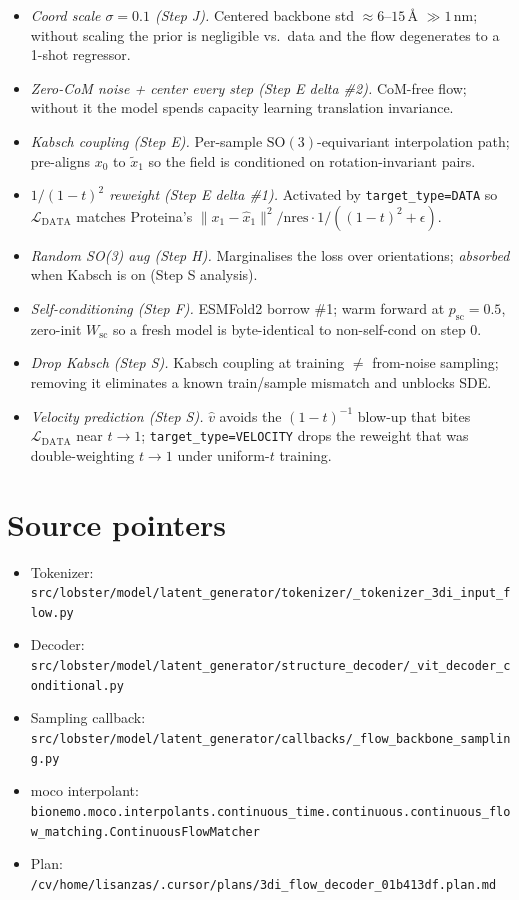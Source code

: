 \documentclass[11pt]{article}
\begin{document}
\begin{itemize}\itemsep -1pt
\item \emph{Coord scale $\sigma=0.1$ (Step J).} Centered backbone std $\approx 6$--$15$\,\AA{} $\gg 1$\,nm; without scaling the prior is negligible vs.\ data and the flow degenerates to a 1-shot regressor.
\item \emph{Zero-CoM noise + center every step (Step E delta \#2).} CoM-free flow; without it the model spends capacity learning translation invariance.
\item \emph{Kabsch coupling (Step E).} Per-sample $\mathrm{SO}(3)$-equivariant interpolation path; pre-aligns $x_0$ to $\tilde x_1$ so the field is conditioned on rotation-invariant pairs.
\item \emph{$1/(1-t)^2$ reweight (Step E delta \#1).} Activated by \texttt{target\_type=DATA} so $\mathcal{L}_\text{DATA}$ matches Proteina's $\|x_1 - \hat{x}_1\|^2 / \mathrm{nres} \cdot 1/((1-t)^2+\epsilon)$.
\item \emph{Random SO(3) aug (Step H).} Marginalises the loss over orientations; \emph{absorbed} when Kabsch is on (Step S analysis).
\item \emph{Self-conditioning (Step F).} ESMFold2 borrow \#1; warm forward at $p_\text{sc}=0.5$, zero-init $W_\text{sc}$ so a fresh model is byte-identical to non-self-cond on step 0.
\item \emph{Drop Kabsch (Step S).} Kabsch coupling at training $\neq$ from-noise sampling; removing it eliminates a known train/sample mismatch and unblocks SDE.
\item \emph{Velocity prediction (Step S).} $\hat{v}$ avoids the $(1-t)^{-1}$ blow-up that bites $\mathcal{L}_\text{DATA}$ near $t\to 1$; \texttt{target\_type=VELOCITY} drops the reweight that was double-weighting $t\to 1$ under uniform-$t$ training.
\end{itemize}

\section*{Source pointers}

\begin{itemize}\itemsep -1pt
\item Tokenizer: \texttt{src/lobster/model/latent\_generator/tokenizer/\_tokenizer\_3di\_input\_flow.py}
\item Decoder: \texttt{src/lobster/model/latent\_generator/structure\_decoder/\_vit\_decoder\_conditional.py}
\item Sampling callback: \texttt{src/lobster/model/latent\_generator/callbacks/\_flow\_backbone\_sampling.py}
\item moco interpolant: \texttt{bionemo.moco.interpolants.continuous\_time.continuous.continuous\_flow\_matching.ContinuousFlowMatcher}
\item Plan: \texttt{/cv/home/lisanzas/.cursor/plans/3di\_flow\_decoder\_01b413df.plan.md}
\end{itemize}
\end{document}
